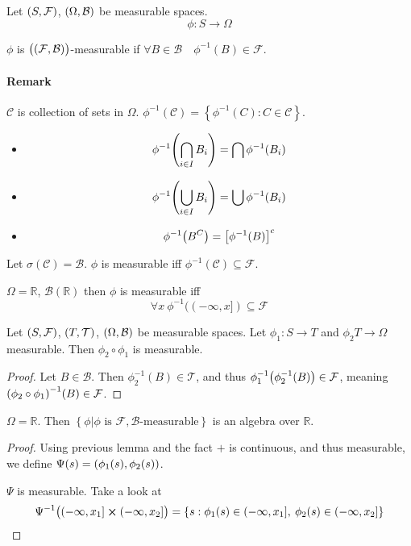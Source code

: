 

\begin{definition}
	Let $\qty(S,\mathcal{F})$, $\qty(\Omega, \mathcal{B})$ be measurable spaces.
	$$\phi: S \to \Omega$$
	
	$\phi$ is $\qty\big((\mathcal{F}, \mathcal{B}))$-measurable if 
	$\forall B\in \mathcal{B} \quad \phi^{-1}(B) \in \mathcal{F} $.
\end{definition}

\paragraph{Remark}
$\mathcal{C}$ is collection of sets in $\Omega$. $\phi^{-1}(\mathcal{C}) = \left\{ \phi^{-1}(C) : C \in \mathcal{C} \right\}$.
\begin{itemize}
	\item $$\phi^{-1}\qty(\bigcap_{i\in I} B_i) =\bigcap \phi^{-1} (B_i)$$
	\item $$\phi^{-1}\qty(\bigcup_{i\in I} B_i) =\bigcup \phi^{-1} (B_i)$$
	\item $$\phi^{-1}\qty(B^C) =\qty[\phi^{-1} (B)]^c$$
\end{itemize}

\begin{lemma}
	Let $\sigma(\mathcal{C}) = \mathcal{B}$. $\phi$ is measurable iff $\phi^{-1}(\mathcal{C}) \subseteq \mathcal{F}$.
	
	\begin{coll}
		$\Omega = \mathbb{R}$, $\mathcal{B}(\mathbb{R})$ then $\phi$ is measurable iff
		$$\forall x \: \phi^{-1}((-\infty, x]) \subseteq \mathcal{F}$$
	\end{coll}
\end{lemma}
\begin{lemma}
	Let $\qty(S,\mathcal{F})$, $\qty(T, \mathcal{T})$, $\qty(\Omega, \mathcal{B})$ be measurable spaces. Let $\phi_1: S \to T$ and $\phi_2 T \to \Omega$ measurable. Then $\phi_2 \circ \phi_1$ is measurable.
	\begin{proof}
		Let $B\in \mathcal{B}$. Then $\phi_2^{-1}(B) \in \mathcal{T}$, and thus $\phi_1^{-1}\qty(\phi_2^{-1}(B)) \in \mathcal{F}$, meaning $\qty(\phi_2 \circ \phi_1)^{-1}\qty(B) \in \mathcal{F}$.
	\end{proof}
\end{lemma}
\begin{lemma}
	$\Omega = \mathbb{R}$. Then $\left\{ \phi| \phi \text{ is } \mathcal{F}, \mathcal{B} \text{-measurable} \right\}$ is an algebra over $\mathbb{R}$.
	\begin{proof}
		Using previous lemma and the fact $+$ is continuous, and thus measurable, we define $\Psi(s) = \qty(\phi_1(s), \phi_2(s))$.
		
		$\Psi$ is measurable. Take a look at
		$$\Psi^{-1}\big((-\infty, x_1] \cross (-\infty, x_2] \big) = \left\{  s: \phi_1(s) \in (-\infty, x_1] ,\: \phi_2(s) \in (-\infty, x_2]  \right\}$$
		
	\end{proof}
\end{lemma}

